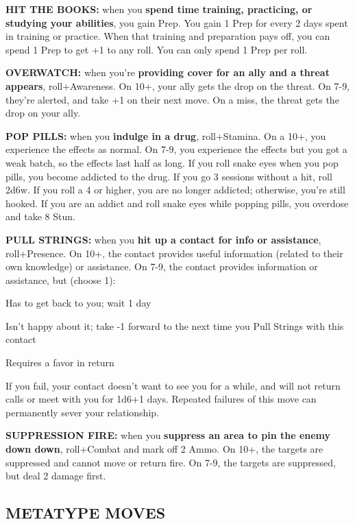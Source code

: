 \documentclass[oneside,10pt]{article}
\begin{document}
\begin{multicols}{2}
\textbf{HIT THE BOOKS:} when you \textbf{spend time training, practicing,
or studying your abilities}, you gain Prep. You gain 1 Prep for
every 2 days spent in training or practice. When that training
and preparation pays off, you can spend 1 Prep to get +1 to
any roll. You can only spend 1 Prep per roll.

\textbf{OVERWATCH:} when you’re \textbf{providing cover for an ally and
a threat appears}, roll+Awareness. On 10+, your ally gets
the drop on the threat. On 7-9, they’re alerted, and take +1
on their next move. On a miss, the threat gets the drop on
your ally.

\textbf{POP PILLS:} when you \textbf{indulge in a drug}, roll+Stamina. On a
10+, you experience the effects as normal. On 7-9, you experience the effects but you got a weak batch, so the effects
last half as long.
If you roll snake eyes when you pop pills, you become addicted to the drug. If you go 3 sessions without a hit, roll 2d6w. If
you roll a 4 or higher, you are no longer addicted; otherwise,
you’re still hooked. If you are an addict and roll snake eyes
while popping pills, you overdose and take 8 Stun.

\textbf{PULL STRINGS:} when you \textbf{hit up a contact for info or assistance}, roll+Presence. On 10+, the contact provides useful
information (related to their own knowledge) or assistance.
On 7-9, the contact provides information or assistance, but
(choose 1):
\begin{adjustwidth*}{.5cm}{.5cm}

\tcirc{} Has to get back to you; wait 1 day

\tcirc{} Isn’t happy about it; take -1 forward to the next time
you Pull Strings with this contact

\tcirc{} Requires a favor in return
\end{adjustwidth*}

If you fail, your contact doesn’t want to see you for a while,
and will not return calls or meet with you for 1d6+1 days.
Repeated failures of this move can permanently sever your
relationship.

\textbf{SUPPRESSION FIRE:} when you \textbf{suppress an area to pin the
enemy down down}, roll+Combat and mark off 2 Ammo. On
10+, the targets are suppressed and cannot move or return
fire. On 7-9, the targets are suppressed, but deal 2 damage
first.






\subsection{METATYPE MOVES}


\end{multicols}
\end{document}

